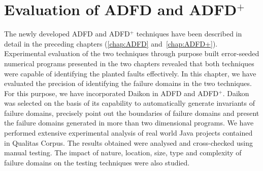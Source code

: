 
\chapter{Evaluation of ADFD and ADFD$^+$}
\label{chap:Evaluation}
	
The newly developed ADFD and ADFD$^+$ techniques have been described in detail in the preceding chapters (\ref{chap:ADFD} and~\ref{chap:ADFD+}). Experimental evaluation of the two techniques through purpose built error-seeded numerical programs presented in the two chapters revealed that both techniques were capable of identifying the planted faults effectively. In this chapter, we have evaluated the precision of identifying the failure domains in the two techniques. For this purpose, we have incorporated Daikon in ADFD and ADFD$^+$. Daikon was selected on the basis of its capability to automatically generate invariants of failure domains, precisely point out the boundaries of failure domains and present the failure domains generated in more than two dimensional programs. We have performed extensive experimental analysis of real world Java projects contained in Qualitas Corpus. The results obtained were analysed and cross-checked using manual testing. The impact of nature, location, size, type and complexity of failure domains on the testing techniques were also studied. 




  





